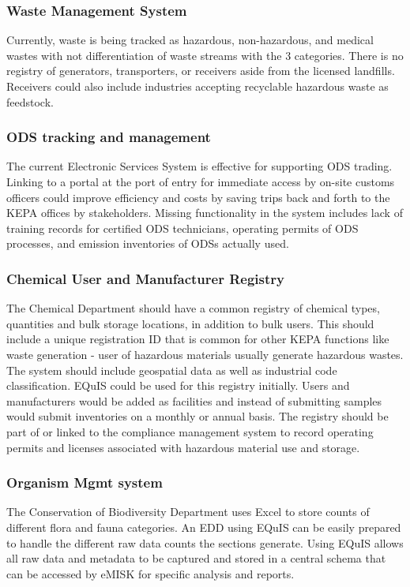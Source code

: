 \subsubsection{Waste Management System}
Currently, waste is being tracked as hazardous, non-hazardous, and medical wastes with not differentiation of waste streams with the 3 categories. There is no registry of generators, transporters, or receivers aside from the licensed landfills. Receivers could also include industries accepting recyclable hazardous waste as feedstock.

\subsubsection{ODS tracking and management}
The current Electronic Services System is effective for supporting ODS trading. Linking to a portal at the port of entry for immediate access by on-site customs officers could improve efficiency and costs by saving trips back and forth to the KEPA offices by stakeholders. Missing functionality in the system includes lack of training records for certified ODS technicians, operating permits of ODS processes, and emission inventories of ODSs actually used.

\subsubsection{Chemical User  and Manufacturer Registry}
The Chemical Department should have a common registry of chemical types, quantities and bulk storage locations, in addition to bulk users. This should include a unique registration ID that is common for other KEPA functions like waste generation - user of hazardous materials usually generate hazardous wastes. The system should include geospatial data as well as industrial code classification. EQuIS could be used for this registry initially. Users and manufacturers would be added as facilities and instead of submitting samples would submit inventories on a monthly or annual basis. The registry should be part of or linked to the compliance management system to record operating permits and licenses associated with hazardous material use and storage.

\subsubsection{Organism Mgmt system}
The Conservation of Biodiversity Department uses Excel to store counts of different flora and fauna categories. An EDD using EQuIS can be easily prepared to handle the different raw data counts the sections generate. Using EQuIS allows all raw data and metadata to be captured and stored in a central schema that can be accessed by eMISK for specific analysis and reports.

